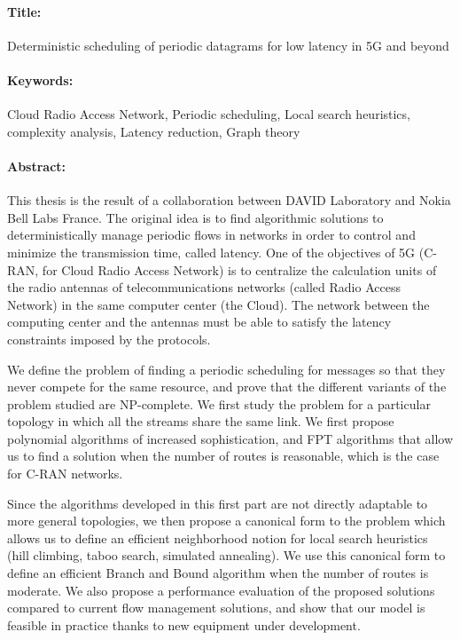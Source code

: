 \begin{mdframed}[linecolor=Prune,linewidth=1]
\vspace{-.25cm}
\paragraph*{Title:} Deterministic scheduling of periodic datagrams for low latency in 5G and beyond 

\begin{small}
\vspace{-.25cm}
\paragraph*{Keywords:}  Cloud Radio Access Network, Periodic scheduling, Local search heuristics, complexity analysis, Latency reduction,  Graph theory
\vspace{-.5cm}
\begin{multicols}{2}
\paragraph*{Abstract:} This thesis is the result of a collaboration between DAVID Laboratory and Nokia Bell Labs France.
The original idea is to find algorithmic solutions to deterministically manage periodic flows in networks in order to control and minimize the transmission time, called latency. One of the objectives of 5G (C-RAN, for Cloud Radio Access Network) is to centralize the calculation units of the radio antennas of telecommunications networks (called Radio Access Network) in the same computer center (the Cloud). The network between the computing center and the antennas must be able to satisfy the latency constraints imposed by the protocols.

We define the problem of finding a periodic scheduling for messages so that they never compete for the same resource, and prove that the different variants of the problem studied are NP-complete. We first study the problem for a particular topology in which all the streams share the same link. We first propose polynomial algorithms of increased sophistication, and FPT algorithms that allow us to find a solution when the number of routes is reasonable, which is the case for C-RAN networks.

Since the algorithms developed in this first part are not directly adaptable to more general topologies, we then propose a canonical form to the problem which allows us to define an efficient neighborhood notion for local search heuristics (hill climbing, taboo search, simulated annealing). We use this canonical form to define an efficient Branch and Bound algorithm when the number of routes is moderate.
We also propose a performance evaluation of the proposed solutions compared to current flow management solutions, and show that our model is feasible in practice thanks to new equipment under development.

\end{multicols}
\end{small}
\end{mdframed}

